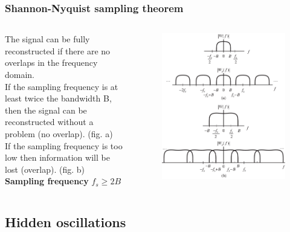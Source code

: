 \begin{frame}
	\frametitle{Shannon-Nyquist sampling theorem}
	\begin{columns}
		The signal can be fully reconstructed if there are no overlaps in the frequency domain.\\
		If the sampling frequency is at least twice the bandwidth B, then the signal can be reconstructed without a problem (no overlap). (fig. a)\\
		If the sampling frequency is too low then information will be lost (overlap). (fig. b)\\
		\medskip
		\textbf{Sampling frequency} $f_s \geq 2 B$
		\begin{figure}
			\includegraphics[width=1\linewidth]{nyquist}
		\end{figure}
	\end{columns}
\end{frame}

\subsection{Hidden oscillations}

